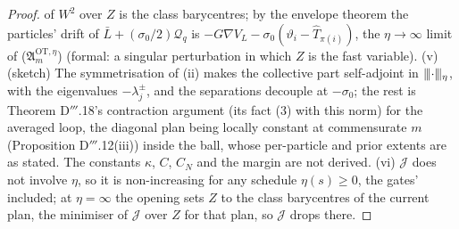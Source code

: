 \begin{proof}
of $W^2$ over $Z$ is the class barycentres; by the envelope theorem the particles' drift of
$\bar L + (\sigma_0/2)\mathcal{Q}_q$ is $-G\nabla V_L - \sigma_0(\vartheta_i - \hat T_{\pi(i)})$, the $\eta\to\infty$
limit of \textup{($\mathfrak{A}_m^{\mathrm{OT},\eta}$)} (formal: a singular perturbation in which $Z$ is the fast
variable). (v) (sketch) The symmetrisation of (ii) makes the collective part self-adjoint in $\lvert\kern-0.25ex\lvert\kern-0.25ex\lvert \cdot\rvert\kern-0.25ex\rvert\kern-0.25ex\rvert_\eta$,
with the eigenvalues $-\lambda_j^\pm$, and the separations decouple at $-\sigma_0$; the rest is Theorem D$'''$.18's
contraction argument (its fact (3) with this norm) for the averaged loop, the diagonal plan being locally constant at
commensurate $m$ (Proposition D$'''$.12(iii)) inside the ball, whose per-particle and prior extents are as stated.
The constants $\kappa$, $C$, $C_N$ and the margin are not derived. (vi) $\mathcal{J}$ does not involve $\eta$, so it
is non-increasing for any schedule $\eta(s)\ge0$, the gates' included; at $\eta = \infty$ the opening sets $Z$ to the
class barycentres of the current plan, the minimiser of $\mathcal{J}$ over $Z$ for that plan, so $\mathcal{J}$ drops
there.
\end{proof}

